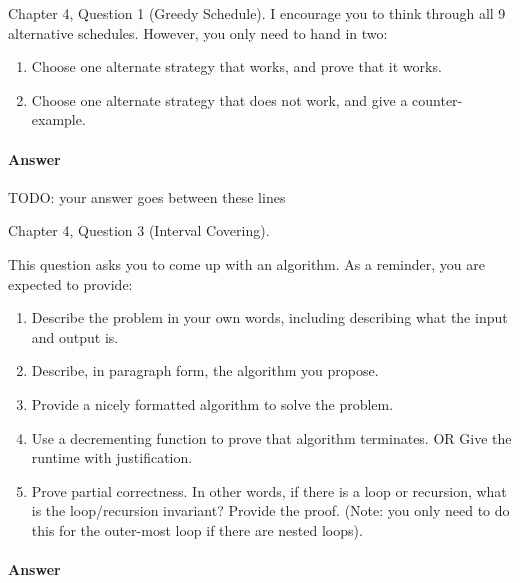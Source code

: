 \documentclass{article}
\begin{document}

\nextprob
{}

Chapter 4, Question 1 (Greedy Schedule).  I encourage you to think through all 9
alternative schedules.  However, you only need to hand in two:
\begin{enumerate}
    \item Choose one alternate strategy that
        works, and prove that it works.
    \item Choose one alternate strategy that does not work, and give a
        counter-example.
\end{enumerate}

\paragraph{Answer}

TODO: your answer goes between these lines



\nextprob
{}

Chapter 4, Question 3 (Interval Covering).

This question asks you to come up with an algorithm.  As a reminder, you are
expected to provide:
\begin{enumerate}
    \item Describe the problem in your own words, including
        describing what the input and output is.
    \item Describe, in paragraph form, the algorithm you propose.
    \item Provide a nicely formatted algorithm to solve the problem.
    \item Use a decrementing function to prove that algorithm terminates.
            OR  Give the runtime with justification.
    \item Prove partial correctness.  In other words, if there is a loop or
        recursion, what is the loop/recursion invariant? Provide the proof.
        (Note: you only need to do this for the outer-most loop if there are
        nested loops).
\end{enumerate}



\paragraph{Answer}
\end{document}
